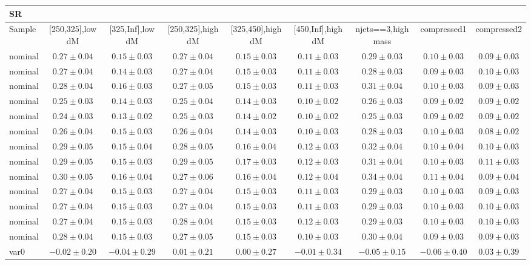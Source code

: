\begin{table}
\begin{center}
\small
\begin{tabular}{lcccccccc}
\hline
SR & & & & & & & &\\
\hline
Sample&[250,325],low dM&[325,Inf],low dM&[250,325],high dM&[325,450],high dM&[450,Inf],high dM&njets==3,high mass&compressed1&compressed2\\
\hline
nominal&$0.27\pm0.04$&$0.15\pm0.03$&$0.27\pm0.04$&$0.15\pm0.03$&$0.11\pm0.03$&$0.29\pm0.03$&$0.10\pm0.03$&$0.09\pm0.03$\\
\hline
nominal&$0.27\pm0.04$&$0.14\pm0.03$&$0.27\pm0.04$&$0.15\pm0.03$&$0.11\pm0.03$&$0.28\pm0.03$&$0.09\pm0.03$&$0.10\pm0.03$\\
nominal&$0.28\pm0.04$&$0.16\pm0.03$&$0.27\pm0.05$&$0.15\pm0.03$&$0.11\pm0.03$&$0.31\pm0.04$&$0.10\pm0.03$&$0.09\pm0.03$\\
nominal&$0.25\pm0.03$&$0.14\pm0.03$&$0.25\pm0.04$&$0.14\pm0.03$&$0.10\pm0.02$&$0.26\pm0.03$&$0.09\pm0.02$&$0.09\pm0.02$\\
nominal&$0.24\pm0.03$&$0.13\pm0.02$&$0.25\pm0.03$&$0.14\pm0.02$&$0.10\pm0.02$&$0.25\pm0.03$&$0.09\pm0.02$&$0.09\pm0.02$\\
nominal&$0.26\pm0.04$&$0.15\pm0.03$&$0.26\pm0.04$&$0.14\pm0.03$&$0.10\pm0.03$&$0.28\pm0.03$&$0.10\pm0.03$&$0.08\pm0.02$\\
nominal&$0.29\pm0.05$&$0.15\pm0.04$&$0.28\pm0.05$&$0.16\pm0.04$&$0.12\pm0.03$&$0.32\pm0.04$&$0.10\pm0.04$&$0.10\pm0.03$\\
nominal&$0.29\pm0.05$&$0.15\pm0.03$&$0.29\pm0.05$&$0.17\pm0.03$&$0.12\pm0.03$&$0.31\pm0.04$&$0.10\pm0.03$&$0.11\pm0.03$\\
nominal&$0.30\pm0.05$&$0.16\pm0.04$&$0.27\pm0.06$&$0.16\pm0.04$&$0.12\pm0.04$&$0.34\pm0.04$&$0.11\pm0.04$&$0.09\pm0.04$\\
nominal&$0.27\pm0.04$&$0.15\pm0.03$&$0.27\pm0.04$&$0.15\pm0.03$&$0.11\pm0.03$&$0.29\pm0.03$&$0.10\pm0.03$&$0.09\pm0.03$\\
nominal&$0.27\pm0.04$&$0.15\pm0.03$&$0.27\pm0.04$&$0.15\pm0.03$&$0.11\pm0.03$&$0.29\pm0.03$&$0.10\pm0.03$&$0.10\pm0.03$\\
nominal&$0.27\pm0.04$&$0.15\pm0.03$&$0.28\pm0.04$&$0.15\pm0.03$&$0.12\pm0.03$&$0.29\pm0.03$&$0.10\pm0.03$&$0.10\pm0.03$\\
nominal&$0.28\pm0.04$&$0.15\pm0.03$&$0.27\pm0.05$&$0.15\pm0.03$&$0.10\pm0.03$&$0.30\pm0.04$&$0.09\pm0.03$&$0.09\pm0.03$\\
var0&$-0.02\pm0.20$&$-0.04\pm0.29$&$0.01\pm0.21$&$0.00\pm0.27$&$-0.01\pm0.34$&$-0.05\pm0.15$&$-0.06\pm0.40$&$0.03\pm0.39$\\

\end{tabular}
\end{center}
\end{table}
